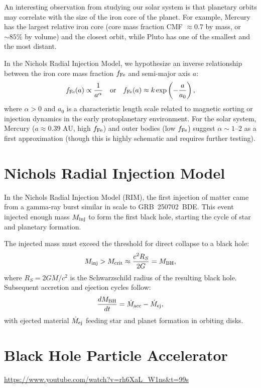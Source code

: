 \documentclass[12pt]{article}
\begin{document}
An interesting observation from studying our solar system is that planetary orbits may correlate with the size of the iron core of the planet. For example, Mercury has the largest relative iron core (core mass fraction CMF $\approx 0.7$ by mass, or $\sim 85\%$ by volume) and the closest orbit, while Pluto has one of the smallest and the most distant.

In the Nichols Radial Injection Model, we hypothesize an inverse relationship between the iron core mass fraction $f_{\rm Fe}$ and semi-major axis $a$:
\begin{equation}
    f_{\rm Fe}(a) \propto \frac{1}{a^\alpha} \quad \text{or} \quad f_{\rm Fe}(a) \approx k \exp\left(-\frac{a}{a_0}\right),
\end{equation}
where $\alpha > 0$ and $a_0$ is a characteristic length scale related to magnetic sorting or injection dynamics in the early protoplanetary environment. For the solar system, Mercury ($a \approx 0.39$ AU, high $f_{\rm Fe}$) and outer bodies (low $f_{\rm Fe}$) suggest $\alpha \sim 1$--$2$ as a first approximation (though this is highly schematic and requires further testing).

\section{Nichols Radial Injection Model}

In the Nichols Radial Injection Model (RIM), the first injection of matter came from a gamma-ray burst similar in scale to GRB~250702~BDE. This event injected enough mass $M_{\rm inj}$ to form the first black hole, starting the cycle of star and planetary formation.

The injected mass must exceed the threshold for direct collapse to a black hole:
\begin{equation}
    M_{\rm inj} > M_{\rm crit} \approx \frac{c^2 R_S}{2G} = M_{\rm BH},
\end{equation}
where $R_S = 2GM/c^2$ is the Schwarzschild radius of the resulting black hole. Subsequent accretion and ejection cycles follow:
\begin{equation}
    \frac{dM_{\rm BH}}{dt} = \dot{M}_{\rm acc} - \dot{M}_{\rm ej},
\end{equation}
with ejected material $\dot{M}_{\rm ej}$ feeding star and planet formation in orbiting disks.

\section{Black Hole Particle Accelerator}
\url{https://www.youtube.com/watch?v=rh6XaL_W1ns&t=99s}
\end{document}
